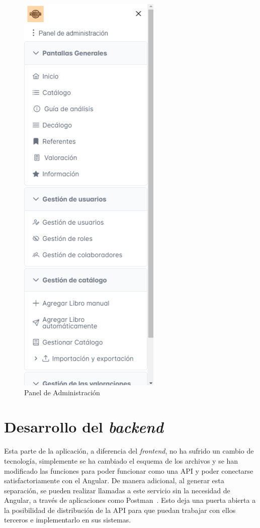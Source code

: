\begin{figure}[h]
    \centering
    \includegraphics[width=0.5\linewidth]{Imagenes/PanelAdmin.png}
    \caption{Panel de Administración}
    \label{Panel de Administración}
\end{figure}
\FloatBarrier

\section{Desarrollo del \textit{backend}}
Esta parte de la aplicación, a diferencia del \textit{frontend}, no ha sufrido un cambio de tecnología, simplemente se ha cambiado el esquema de los archivos y se han modificado las funciones para poder funcionar como una API y poder conectarse satisfactoriamente con el Angular. De manera adicional, al generar esta separación, se pueden realizar llamadas a este servicio sin la necesidad de Angular, a través de aplicaciones como Postman~\cite{Postman}. Esto deja una puerta abierta a la posibilidad de distribución de la API para que puedan trabajar con ellos terceros e implementarlo en sus sistemas.

